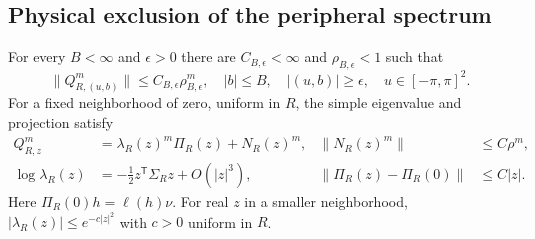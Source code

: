 \subsection{Physical exclusion of the peripheral spectrum}
\begin{theorem}
\label{thm:compact-collision-spectrum}
For every $B<\infty$ and $\epsilon>0$ there are $C_{B,\epsilon}<\infty$
and $\rho_{B,\epsilon}<1$ such that
\begin{equation}\label{eq:full-compact-frequency-gap}
 \|Q_{R,(u,b)}^m\|\le C_{B,\epsilon}\rho_{B,\epsilon}^m,
 \quad |b|\le B,\quad |(u,b)|\ge\epsilon,
 \quad u\in[-\pi,\pi]^2.
\end{equation}
For a fixed neighborhood of zero, uniform in $R$, the simple
eigenvalue and projection satisfy
\begin{align}
 Q_{R,z}^m&=\lambda_R(z)^m\Pi_R(z)+N_R(z)^m,
                 &\|N_R(z)^m\|&\le C\rho^m,
                                               \label{eq:raw-collision-splitting}\\
 \log\lambda_R(z)&=-\tfrac12 z^{\mathsf T}\Sigma_R z+O(|z|^3),
                 &\|\Pi_R(z)-\Pi_R(0)\|&\le C|z|.
                                               \label{eq:raw-collision-expansion}
\end{align}
Here $\Pi_R(0)h=\ell(h)\nu$. For real $z$ in a smaller neighborhood,
$|\lambda_R(z)|\le e^{-c|z|^2}$ with $c>0$ uniform in $R$.
\end{theorem}
